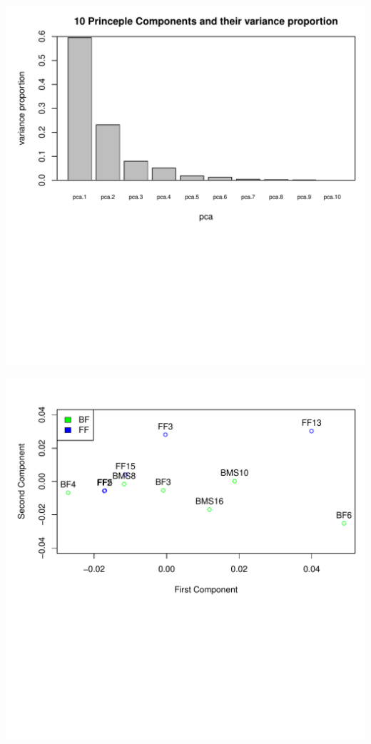 \documentclass{article}\usepackage[]{graphicx}\usepackage[]{color}
\makeatletter
\def\maxwidth{ %
  \ifdim\Gin@nat@width>\linewidth
    \linewidth
  \else
    \Gin@nat@width
  \fi
}
\makeatother
\begin{document}
\begin{center}
\begin{Schunk}
{}



{\centering \includegraphics[width=\maxwidth]{figure/Oct_9-3} 

}



{\centering \includegraphics[width=\maxwidth]{figure/Oct_9-4} 

}

\end{Schunk}
   \end{center}
\end{document}

